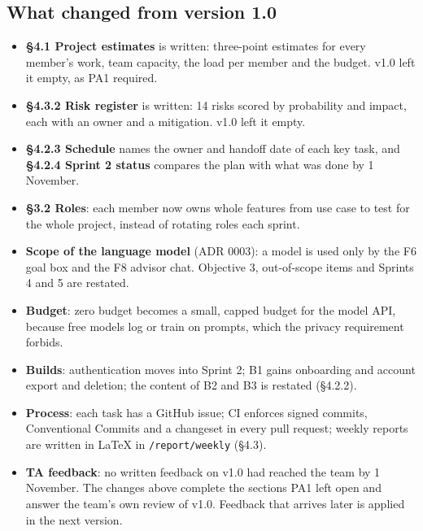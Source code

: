 \documentclass{article}
\newenvironment{changed}{\par\color{chg}}{\par}
\begin{document}
\begin{changed}
\subsection*{What changed from version 1.0}
\begin{itemize}
  \item \textbf{§4.1 Project estimates} is written: three-point estimates for every member's work, team capacity, the load
        per member and the budget. v1.0 left it empty, as PA1 required.
  \item \textbf{§4.3.2 Risk register} is written: 14 risks scored by probability and impact, each with an owner and a
        mitigation. v1.0 left it empty.
  \item \textbf{§4.2.3 Schedule} names the owner and handoff date of each key task, and \textbf{§4.2.4 Sprint 2 status}
        compares the plan with what was done by 1 November.
  \item \textbf{§3.2 Roles}: each member now owns whole features from use case to test for the whole project, instead of
        rotating roles each sprint.
  \item \textbf{Scope of the language model} (ADR 0003): a model is used only by the F6 goal box and the F8 advisor chat.
        Objective 3, out-of-scope items and Sprints 4 and 5 are restated.
  \item \textbf{Budget}: zero budget becomes a small, capped budget for the model API, because free models log or train on
        prompts, which the privacy requirement forbids.
  \item \textbf{Builds}: authentication moves into Sprint 2; B1 gains onboarding and account export and deletion; the
        content of B2 and B3 is restated (§4.2.2).
  \item \textbf{Process}: each task has a GitHub issue; CI enforces signed commits, Conventional Commits and a changeset in
        every pull request; weekly reports are written in LaTeX in \texttt{/report/weekly} (§4.3).
  \item \textbf{TA feedback}: no written feedback on v1.0 had reached the team by 1 November. The changes above complete
        the sections PA1 left open and answer the team's own review of v1.0. Feedback that arrives later is applied in the
        next version.
\end{itemize}
\end{changed}

\par\vspace{0.6cm}
{\hypersetup{linkcolor=ocNavy}\tableofcontents}
\end{document}
